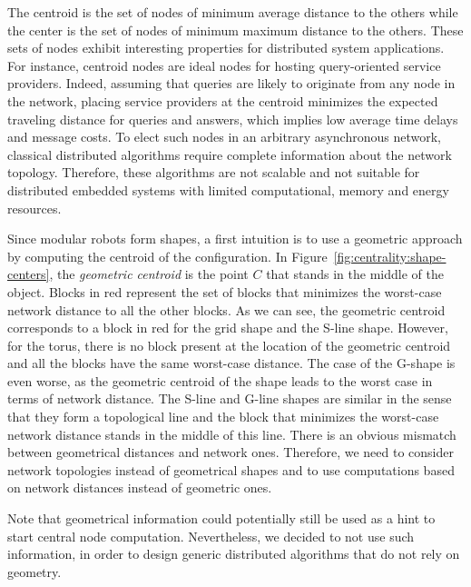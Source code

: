 The centroid is the set of nodes of minimum average distance to the others while the center is the set of nodes of minimum maximum distance to the others. These sets of nodes exhibit interesting properties for distributed system applications. For instance, centroid nodes are ideal nodes for hosting query-oriented service providers. Indeed, assuming that queries are likely to originate from any node in the network, placing service providers at the centroid minimizes the expected traveling distance for queries and answers, which implies low average time delays and message costs. To elect such nodes in an arbitrary asynchronous network, classical distributed algorithms require complete information about the network topology. Therefore, these algorithms are not scalable and not suitable for distributed embedded systems with limited computational, memory and energy resources.

Since modular robots form shapes, a first intuition is to use a geometric approach by computing the centroid of the configuration. In Figure~\ref{fig:centrality:shape-centers}, the {\em geometric centroid} is the point $C$ that stands in the middle of the object. Blocks in red represent the set of blocks that minimizes the worst-case network distance to all the other blocks. As we can see, the geometric centroid corresponds to a block in red for the grid shape and the S-line shape. However, for the torus, there is no block present at the location of the geometric centroid and all the blocks have the same worst-case distance. The case of the G-shape is even worse, as the geometric centroid of the shape leads to the worst case in terms of network distance. The S-line and G-line shapes are similar in the sense that they form a topological line and the block that minimizes the worst-case network distance stands in the middle of this line. There is an obvious mismatch between geometrical distances and network ones. Therefore, we need to consider network topologies instead of geometrical shapes and to use computations based on network distances instead of geometric ones.

Note that geometrical information could potentially still be used as a hint to start central node computation. Nevertheless, we decided to not use such information, in order to design generic distributed algorithms that do not rely on geometry.

